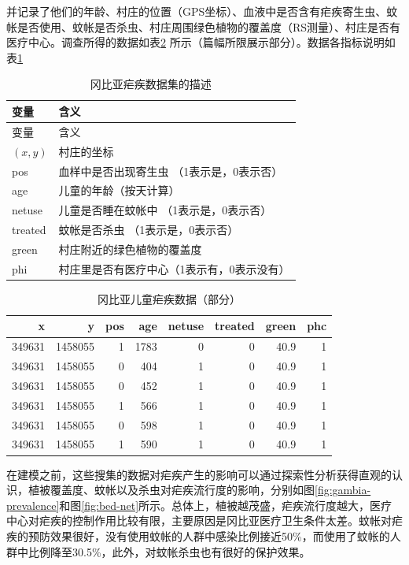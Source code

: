 \documentclass[hyperref, a4paper, UTF8, zihao = -4, linespread = 1.25, scheme = chinese]{ctexbook}
\begin{document}
并记录了他们的年龄、村庄的位置（GPS坐标）、血液中是否含有疟疾寄生虫、蚊帐是否使用、蚊帐是否杀虫、村庄周围绿色植物的覆盖度（RS测量）、村庄是否有医疗中心\citep{Diggle2002}。调查所得的数据如表\ref{tab:gambia-malaria}
所示（篇幅所限展示部分）。数据各指标说明如表\ref{tab:gambia-data}

\begin{longtable}[]{@{}ll@{}}
\caption{\label{tab:gambia-data} 冈比亚疟疾数据集的描述}\tabularnewline
\toprule
变量 & 含义\tabularnewline
\midrule
\endfirsthead
\toprule
变量 & 含义\tabularnewline
\midrule
\endhead
\((x,y)\) & 村庄的坐标\tabularnewline
pos & 血样中是否出现寄生虫 （1表示是，0表示否）\tabularnewline
age & 儿童的年龄（按天计算）\tabularnewline
netuse & 儿童是否睡在蚊帐中 （1表示是，0表示否）\tabularnewline
treated & 蚊帐是否杀虫 （1表示是，0表示否）\tabularnewline
green & 村庄附近的绿色植物的覆盖度\tabularnewline
phi & 村庄里是否有医疗中心（1表示有，0表示没有）\tabularnewline
\bottomrule
\end{longtable}

\begin{table}

\caption{\label{tab:gambia-malaria}冈比亚儿童疟疾数据（部分）}
\centering
\begin{tabular}[t]{rrrrrrrr}
\toprule
x & y & pos & age & netuse & treated & green & phc\\
\midrule
349631 & 1458055 & 1 & 1783 & 0 & 0 & 40.9 & 1\\
349631 & 1458055 & 0 & 404 & 1 & 0 & 40.9 & 1\\
349631 & 1458055 & 0 & 452 & 1 & 0 & 40.9 & 1\\
349631 & 1458055 & 1 & 566 & 1 & 0 & 40.9 & 1\\
349631 & 1458055 & 0 & 598 & 1 & 0 & 40.9 & 1\\
349631 & 1458055 & 1 & 590 & 1 & 0 & 40.9 & 1\\
\bottomrule
\end{tabular}
\end{table}

在建模之前，这些搜集的数据对疟疾产生的影响可以通过探索性分析获得直观的认识，植被覆盖度、蚊帐以及杀虫对疟疾流行度的影响，分别如图\ref{fig:gambia-prevalence}和图\ref{fig:bed-net}所示。总体上，植被越茂盛，疟疾流行度越大，医疗中心对疟疾的控制作用比较有限，主要原因是冈比亚医疗卫生条件太差。蚊帐对疟疾的预防效果很好，没有使用蚊帐的人群中感染比例接近50\%，而使用了蚊帐的人群中比例降至30.5\%，此外，对蚊帐杀虫也有很好的保护效果。
\end{document}
